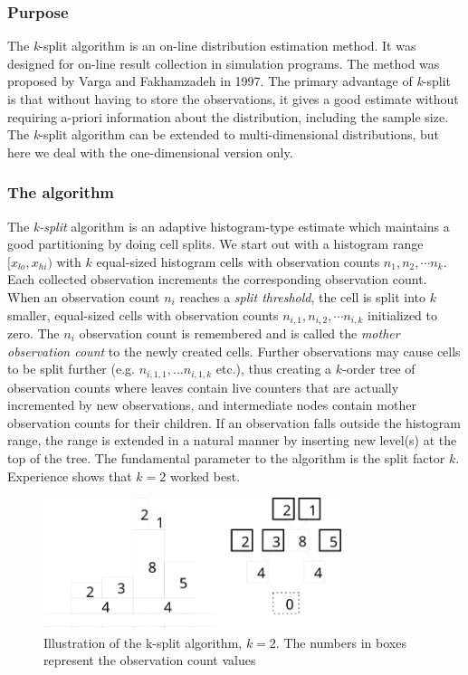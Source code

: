 \subsubsection{Purpose}


The \textit{k}-split algorithm is an on-line distribution
estimation method.  It was
designed for on-line result collection in simulation programs.  The
method was proposed by Varga and Fakhamzadeh in 1997. The primary
advantage of \textit{k}-split is that without having to store the
observations, it gives a good estimate without requiring a-priori
information about the distribution, including the sample size. The
\textit{k}-split algorithm can be extended to multi-dimensional
distributions, but here we deal
with the one-dimensional version only.


\subsubsection{The algorithm}


The \textit{k-split} algorithm is an adaptive histogram-type estimate which
maintains a good partitioning by doing cell splits. We start out with
a histogram range $[x_{lo}, x_{hi})$ with $k$ equal-sized histogram
cells with observation counts $n_1,n_2, \cdots n_k$.  Each collected
observation increments the corresponding observation count. When an
observation count $n_i$ reaches a \textit{split threshold}, the cell
is split into $k$ smaller, equal-sized cells with observation counts
$n_{i,1}, n_{i,2}, \cdots n_{i,k}$ initialized to zero. The $n_i$
observation count is remembered and is called the \textit{mother
  observation count} to the newly created cells. Further observations
may cause cells to be split further (e.g. $n_{i,1,1},...n_{i,1,k}$
etc.), thus creating a $k$-order tree of observation counts where
leaves contain live counters that are actually incremented by new
observations, and intermediate nodes contain mother observation counts
for their children. If an observation falls outside the histogram
range, the range is extended in a natural manner by inserting new
level(s) at the top of the tree. The fundamental parameter to the
algorithm is the split factor $k$. Experience shows that $k=2$ worked best.

\begin{figure}[htbp]
  \begin{center}
    \includegraphics[width=3.442in, height=1.518in]{figures/ksplit1}
    \caption{Illustration of the k-split algorithm, $k=2$. The
      numbers in boxes represent the observation count values}
  \end{center}
\end{figure}


